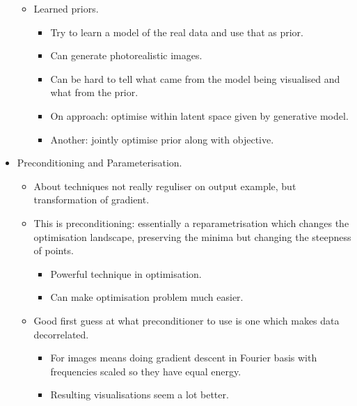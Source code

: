 \begin{itemize}
\begin{itemize}
\begin{itemize}
        \end{itemize}
        \item Learned priors.
        \begin{itemize}
            \item Try to learn a model of the real data and use that as prior.
            \item Can generate photorealistic images.
            \item Can be hard to tell what came from the model being visualised and what from the prior.
            \item On approach: optimise within latent space given by generative model.
            \item Another: jointly optimise prior along with objective.
        \end{itemize}
    \end{itemize}
    \item Preconditioning and Parameterisation.
    \begin{itemize}
        \item About techniques not really reguliser on output example, but transformation of gradient.
        \item This is preconditioning: essentially a reparametrisation which changes the optimisation landscape, preserving the minima but changing the steepness of points.
        \begin{itemize}
            \item Powerful technique in optimisation.
            \item Can make optimisation problem much easier.
        \end{itemize}
        \item Good first guess at what preconditioner to use is one which makes data decorrelated.
        \begin{itemize}
            \item For images means doing gradient descent in Fourier basis with frequencies scaled so they have equal energy.
            \item Resulting visualisations seem a lot better.
        \end{itemize}
    \end{itemize}
\end{itemize}